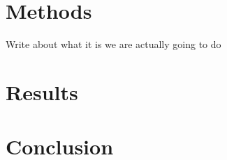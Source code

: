 \documentclass[12pt]{amsart}
\begin{document}
\begin{comment}
\subsubsection{Spectral Clustering}
Spectral clustering is a clustering technique that uses the eigenvectors of a matrix derived from the data to cluster the data points. One common approach is to use the Laplacian matrix of the graph defined by the data points. Once we have the Laplacian matrix, we can compute its eigenvectors and eigenvalues. The eigenvectors corresponding to the smallest eigenvalues (excluding the first eigenvector, which is constant) are used as the embedding of the data points. The embedding maps the data points to a low-dimensional space, where the pairwise distances reflect the underlying structure of the data. Finally, we can use a clustering algorithm (e.g., k-means) to cluster the data points in the embedding space. The number of clusters can be determined using the number of zero eigenvalues of the graph Laplacian.

\end{comment}

\section{Methods}
Write about what it is we are actually going to do

\section{Results}

\section{Conclusion}




\end{document}
